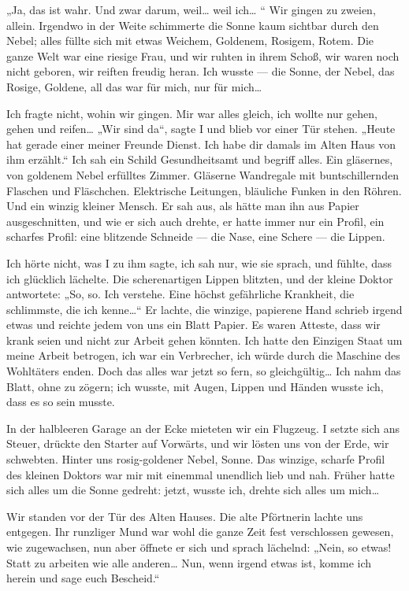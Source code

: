 „Ja, das ist wahr. Und zwar darum, weil\ldots{} weil ich\ldots{} “ Wir gingen
zu zweien, allein. Irgendwo in der Weite schimmerte die Sonne kaum
sichtbar durch den Nebel; alles füllte sich mit etwas Weichem,
Goldenem, Rosigem, Rotem. Die ganze Welt war eine riesige Frau, und
wir ruhten in ihrem Schoß, wir waren noch nicht geboren, wir
reiften freudig heran. Ich wusste — die Sonne, der Nebel, das
Rosige, Goldene, all das war für mich, nur für mich\ldots{}

Ich fragte nicht, wohin wir gingen. Mir war alles gleich, ich
wollte nur gehen, gehen und reifen\ldots{} „Wir sind da“, sagte I und
blieb vor einer Tür stehen. „Heute hat gerade einer meiner Freunde
Dienst. Ich habe dir damals im Alten Haus von ihm erzählt.“ Ich sah
ein Schild Gesundheitsamt und begriff alles. Ein gläsernes, von
goldenem Nebel erfülltes Zimmer. Gläserne Wandregale mit
buntschillernden Flaschen und Fläschchen. Elektrische Leitungen,
bläuliche Funken in den Röhren. Und ein winzig kleiner Mensch. Er
sah aus, als hätte man ihn aus Papier ausgeschnitten, und wie er
sich auch drehte, er hatte immer nur ein Profil, ein scharfes
Profil: eine blitzende Schneide — die Nase, eine Schere — die
Lippen.

Ich hörte nicht, was I zu ihm sagte, ich sah nur, wie sie sprach,
und fühlte, dass ich glücklich lächelte. Die scherenartigen Lippen
blitzten, und der kleine Doktor antwortete: „So, so. Ich verstehe.
Eine höchst gefährliche Krankheit, die schlimmste, die ich
kenne\ldots{}“ Er lachte, die winzige, papierene Hand schrieb irgend
etwas und reichte jedem von uns ein Blatt Papier. Es waren Atteste,
dass wir krank seien und nicht zur Arbeit gehen könnten. Ich hatte
den Einzigen Staat um meine Arbeit betrogen, ich war ein
Verbrecher, ich würde durch die Maschine des Wohltäters enden. Doch
das alles war jetzt so fern, so gleichgültig\ldots{} Ich nahm das Blatt,
ohne zu zögern; ich wusste, mit Augen, Lippen und Händen wusste
ich, dass es so sein musste.

In der halbleeren Garage an der Ecke mieteten wir ein Flugzeug. I
setzte sich ans Steuer, drückte den Starter auf
Vorwärts, und wir lösten uns von der Erde, wir schwebten. Hinter
uns rosig-goldener Nebel, Sonne. Das winzige, scharfe Profil des
kleinen Doktors war mir mit einemmal unendlich lieb und nah. Früher
hatte sich alles um die Sonne gedreht: jetzt, wusste ich, drehte
sich alles um mich\ldots{}

Wir standen vor der Tür des Alten Hauses. Die alte Pförtnerin
lachte uns entgegen. Ihr runzliger Mund war wohl die ganze Zeit
fest verschlossen gewesen, wie zugewachsen, nun aber öffnete er
sich und sprach lächelnd: „Nein, so etwas! Statt zu arbeiten wie
alle anderen\ldots{} Nun, wenn irgend etwas ist, komme ich herein und
sage euch Bescheid.“

